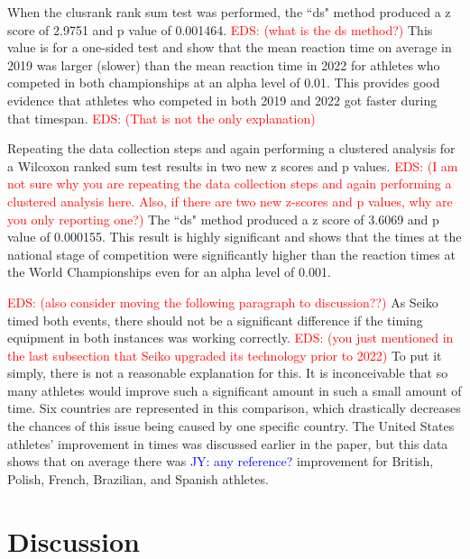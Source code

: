 \documentclass[12pt, letterpaper, titlepage]{article}
\newcommand{\jy}[1]{\textcolor{blue}{JY: #1}}
\newcommand{\eds}[1]{\textcolor{red}{EDS: (#1)}}
\begin{document}
When the clusrank rank sum test was performed, the ``ds" method produced a z score of
2.9751 and p value of 0.001464.  \eds{what is the ds method?} 
This value is for a one-sided test and show that
the mean reaction time on average in 2019 was larger (slower) than the mean 
reaction time
in 2022 for athletes who competed in both championships at an alpha level of 0.01.
This provides good evidence that athletes who competed in both 2019 and 2022 got
faster during that timespan.  \eds{That is not the only explanation}


Repeating the data collection steps and
again performing a clustered analysis for a Wilcoxon ranked sum test
results in two new z scores and p values. 
\eds{I am not sure why you are repeating the data collection steps and
again performing a clustered analysis here.  Also, if there are two new z-scores
and p values, why are you only reporting one?}
  The ``ds" method produced a z score of
3.6069 and p value of 0.000155. This result is highly significant and shows that
the times at the national stage of competition were significantly higher than
the reaction times at the World Championships even for an alpha level of 0.001.

\eds{also consider moving the following paragraph to discussion??}
As Seiko timed both events, there should not be a significant
difference if the timing equipment in both instances was working correctly.
\eds{you just mentioned in the last subsection that Seiko upgraded its 
technology prior to 2022}
  To put it simply, there is not a reasonable explanation for 
this. It is inconceivable that so many athletes would improve such a significant
amount in such a small amount of time. Six countries are represented in this 
comparison, which drastically decreases the chances of this issue being caused by
one specific country.  The United States athletes' improvement in times was
discussed earlier in the paper, but this data shows that on average there was
\jy{any reference?}
improvement for British, Polish, French, Brazilian, and Spanish athletes.


\section{Discussion}\label{sec:Discussion}
\end{document}
